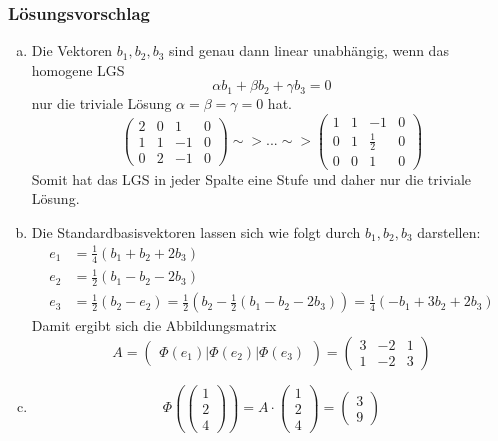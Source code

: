 \documentclass[a4paper,11pt]{scrartcl}
\begin{document}
\subsubsection*{Lösungsvorschlag}
\begin{enumerate}[a)]
\item Die Vektoren $b_1,b_2,b_3$ sind genau dann linear unabhängig, wenn das homogene LGS 
$$
\alpha b_1 +\beta b_2 + \gamma b_3 =0
$$
nur die triviale Lösung $\alpha=\beta=\gamma=0$ hat.
$$
\left(\begin{array}{ccc|c}2&0&1&0\\1&1&-1&0\\0&2&-1&0 \end{array}\right) \sim> ... \sim>\left(\begin{array}{ccc|c} 1&1&-1&0\\ 0&1&\frac{1}{2}&0 \\ 0&0&1&0\end{array}\right)
$$
Somit hat das LGS in jeder Spalte eine Stufe und daher nur die triviale Lösung.
\item Die Standardbasisvektoren lassen sich wie folgt durch $b_1,b_2,b_3$ darstellen:
\begin{align*}
e_1&=\frac{1}{4}(b_1+b_2+2b_3)\\
e_2&=\frac{1}{2}(b_1-b_2-2b_3)\\
e_3&=\frac{1}{2}(b_2-e_2)=\frac{1}{2}(b_2-\frac{1}{2}(b_1-b_2-2b_3))=\frac{1}{4}(-b_1+3b_2+2b_3)
\end{align*}
Damit ergibt sich die Abbildungsmatrix
$$
A=\begin{pmatrix} \Phi(e_1)|\Phi(e_2)|\Phi(e_3) \end{pmatrix}=\begin{pmatrix} 3 & -2 &1 \\ 1&-2&3 \end{pmatrix}
$$
\item 
$$
\Phi(\begin{pmatrix} 1\\2\\4 \end{pmatrix})=A\cdot \begin{pmatrix} 1\\2\\4 \end{pmatrix}=\begin{pmatrix} 3 \\ 9 \end{pmatrix}
$$

\end{enumerate}
\end{document}
